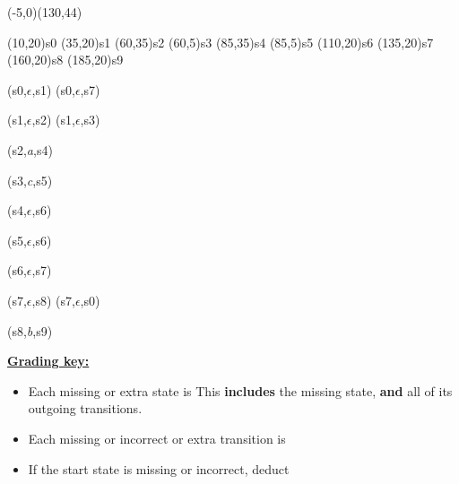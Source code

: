 \documentclass[11pt,fleqn]{article}
\begin{document}
\begin{enumerate}
          \begin{automaton}(-5,0)(130,44)


            \state[start](10,20){s0}
            \state(35,20){s1}
            \state(60,35){s2}
            \state(60,5){s3}
            \state(85,35){s4}
            \state(85,5){s5}
            \state(110,20){s6}
            \state(135,20){s7}
            \state(160,20){s8}
            \state[final](185,20){s9}

            \transition(s0,$\epsilon$,s1)
            \transition[curved,angle=48](s0,$\epsilon$,s7)

            \transition(s1,$\epsilon$,s2)
            \transition[labeloffset=-7](s1,$\epsilon$,s3)

            \transition(s2,\emph{a},s4)

            \transition[labeloffset=-7](s3,\emph{c},s5)

            \transition(s4,$\epsilon$,s6)

            \transition[labeloffset=-7](s5,$\epsilon$,s6)

            \transition(s6,$\epsilon$,s7)

            \transition(s7,$\epsilon$,s8)
            \transition[curved,angle=48](s7,$\epsilon$,s0)

            \transition(s8,\emph{b},s9)

          \end{automaton}

          \bigskip

          \begin{info}{\textbf{\underline{Grading key:}}}

            \smallskip

            \begin{itemize}

              \addtolength{\itemsep}{2mm}

              \item Each missing or extra state is  This
                    \textbf{includes} the missing state, \textbf{and} all of
                    its outgoing transitions.

              \item Each missing or incorrect or extra transition is

              \item If the start state is missing or incorrect, deduct


\end{itemize}
\end{info}
\end{enumerate}
\end{document}
